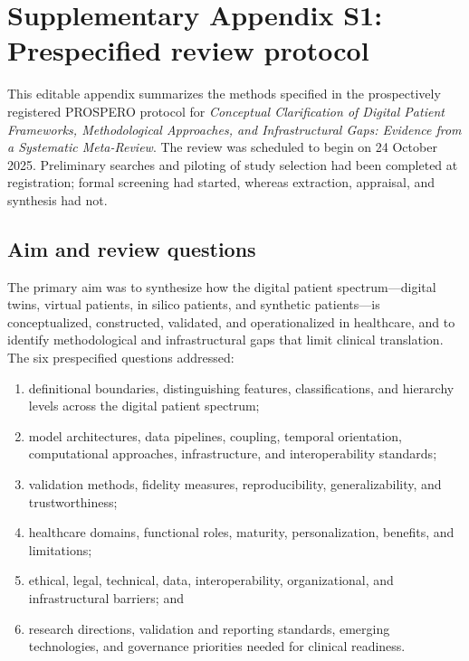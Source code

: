 \clearpage
\setcounter{table}{0}
\renewcommand{\thetable}{S\arabic{table}}
\section{Supplementary Appendix S1: Prespecified review protocol}
\label{app:protocol}

This editable appendix summarizes the methods specified in the prospectively registered PROSPERO protocol for \textit{Conceptual Clarification of Digital Patient Frameworks, Methodological Approaches, and Infrastructural Gaps: Evidence from a Systematic Meta-Review}. The review was scheduled to begin on 24 October 2025. Preliminary searches and piloting of study selection had been completed at registration; formal screening had started, whereas extraction, appraisal, and synthesis had not.

\subsection{Aim and review questions}

The primary aim was to synthesize how the digital patient spectrum---digital twins, virtual patients, in silico patients, and synthetic patients---is conceptualized, constructed, validated, and operationalized in healthcare, and to identify methodological and infrastructural gaps that limit clinical translation. The six prespecified questions addressed:

\begin{enumerate}[label=\textbf{RQ\arabic*.},leftmargin=*]
    \item definitional boundaries, distinguishing features, classifications, and hierarchy levels across the digital patient spectrum;
    \item model architectures, data pipelines, coupling, temporal orientation, computational approaches, infrastructure, and interoperability standards;
    \item validation methods, fidelity measures, reproducibility, generalizability, and trustworthiness;
    \item healthcare domains, functional roles, maturity, personalization, benefits, and limitations;
    \item ethical, legal, technical, data, interoperability, organizational, and infrastructural barriers; and
    \item research directions, validation and reporting standards, emerging technologies, and governance priorities needed for clinical readiness.
\end{enumerate}

